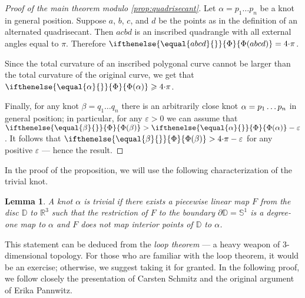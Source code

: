 \documentclass{article}
\newcommand*{\z}[1]{#1\nobreak\discretionary{}%
            {\hbox{$\mathsurround=0pt #1$}}{}}
\theoremstyle{theorem}
\newtheorem{Crofton-type formula}[theorem]{Crofton-type formula}
\newtheorem{Lemma}[theorem]{Lemma}
\newtheorem{Douglas--Rado theorem}[theorem]{Douglas--Rado theorem}
\newtheorem{Extended monotonicity theorem}[theorem]{Extended monotonicity theorem}
\theoremstyle{definition}
\def\DD{\mathbb{D}}
\def\RR{\mathbb{R}}
\newcommand*{\tc}[1]{\ifthenelse{\equal{#1}{}}{\Phi}{\Phi({#1})}}%
\def\eps{\varepsilon}
\def\ge{\geqslant}
\begin{document}
\begin{proof}[Proof of the main theorem modulo \ref{prop:quadrisecant}]
Let $\alpha=p_1\dots p_n$ be a knot in general position.
Suppose $a$, $b$, $c$, and $d$ be the points as in the definition of an alternated quadrisecant.
Then $acbd$ is an inscribed quadrangle with all external angles equal to $\pi$.
Therefore $\tc{abcd}=4{\cdot}\pi$.

Since the total curvature of an inscribed polygonal curve cannot be larger than the total curvature of the original curve, we get that $\tc{\alpha}\z\ge 4{\cdot}\pi$.

Finally, for any knot $\beta=q_1\dots q_n$ there is an arbitrarily close knot $\alpha\z=p_1\dots p_n$ in general position;
in particular, for any $\eps>0$ we can assume that $\tc{\beta}>\tc\alpha-\eps$.
It follows that $\tc{\beta}>4{\cdot}\pi-\eps$ for any positive $\eps$ --- hence the result.
\end{proof}

In the proof of the proposition, we will use the following characterization of the trivial knot.

\begin{Lemma}
A knot $\alpha$ is trivial if there exists a piecewise linear map $F$ from the disc $\DD$ to $\RR^3$ such that the  restriction of $F$ to the boundary $\partial\DD=\mathbb{S}^1$ is a degree-one map to $\alpha$ and $F$ does not map interior points of $\DD$ to $\alpha$.
\end{Lemma}

This statement can be deduced from  the \textit{loop theorem} --- a heavy weapon of 3-dimensional topology.
For those who are familiar with the loop theorem, it would be an exercise; otherwise, we suggest taking it for granted.
In the following proof, we follow closely the presentation of Carsten Schmitz \cite{schmitz} and the original argument of Erika Pannwitz.
\end{document}
